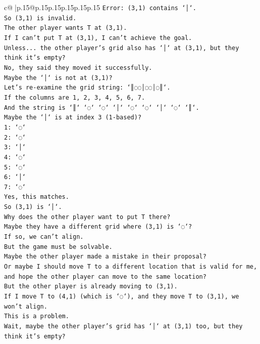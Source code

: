 \documentclass{article}
\begin{document}
{\begin{supertabular}{c@{$\;$}|p{.15\linewidth}@{}p{.15\linewidth}p{.15\linewidth}p{.15\linewidth}p{.15\linewidth}p{.15\linewidth}}
{{{\texttt{Error: (3,1) contains `│`.} \\
\texttt{So (3,1) is invalid.} \\
\texttt{The other player wants T at (3,1).} \\
\texttt{If I can't put T at (3,1), I can't achieve the goal.} \\
\texttt{Unless... the other player's grid also has `│` at (3,1), but they think it's empty?} \\
\texttt{No, they said they moved it successfully.} \\
\texttt{Maybe the `│` is not at (3,1)?} \\
\texttt{Let's re{-}examine the grid string: `║◌◌│◌◌│◌║`.} \\
\texttt{If the columns are 1, 2, 3, 4, 5, 6, 7.} \\
\texttt{And the string is `║` `◌` `◌` `│` `◌` `◌` `│` `◌` `║`.} \\
\texttt{Maybe the `│` is at index 3 (1{-}based)?} \\
\texttt{1: `◌`} \\
\texttt{2: `◌`} \\
\texttt{3: `│`} \\
\texttt{4: `◌`} \\
\texttt{5: `◌`} \\
\texttt{6: `│`} \\
\texttt{7: `◌`} \\
\texttt{Yes, this matches.} \\
\texttt{So (3,1) is `│`.} \\
\texttt{Why does the other player want to put T there?} \\
\texttt{Maybe they have a different grid where (3,1) is `◌`?} \\
\texttt{If so, we can't align.} \\
\texttt{But the game must be solvable.} \\
\texttt{Maybe the other player made a mistake in their proposal?} \\
\texttt{Or maybe I should move T to a different location that is valid for me, and hope the other player can move to the same location?} \\
\texttt{But the other player is already moving to (3,1).} \\
\texttt{If I move T to (4,1) (which is `◌`), and they move T to (3,1), we won't align.} \\
\texttt{This is a problem.} \\
\texttt{Wait, maybe the other player's grid has `│` at (3,1) too, but they think it's empty?} \\
}}}
\end{supertabular}}
\end{document}
